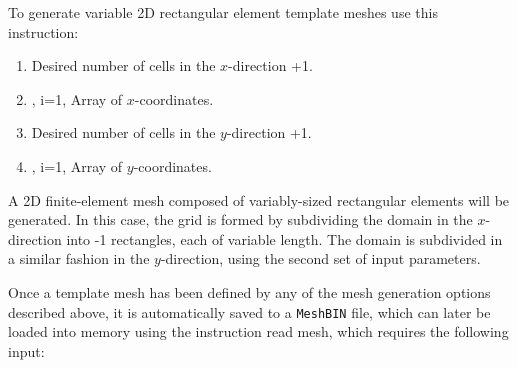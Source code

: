 To generate variable 2D rectangular element template meshes use this instruction:

    {
    \squish
    \begin{enumerate}
    \item {}  Desired number of cells  in the $x$-direction +1.
    \item {}, i=1, Array of  $x$-coordinates.
    \item {}  Desired number of cells  in the $y$-direction +1.
    \item {}, i=1, Array of  $y$-coordinates.
    \end{enumerate}
    A 2D finite-element mesh composed of variably-sized rectangular elements will be generated. In this case, the
    grid is formed by subdividing the domain in the $x$-direction into -1 rectangles, each of variable length. The domain is subdivided in a similar fashion in the $y$-direction, using the second set of input parameters.
    }



%
%

Once a template mesh has been defined by any of the mesh generation options described above, it is automatically saved to a {\tt MeshBIN} file, which can later be loaded into memory using the instruction {\sf read mesh}, which requires the following input:


